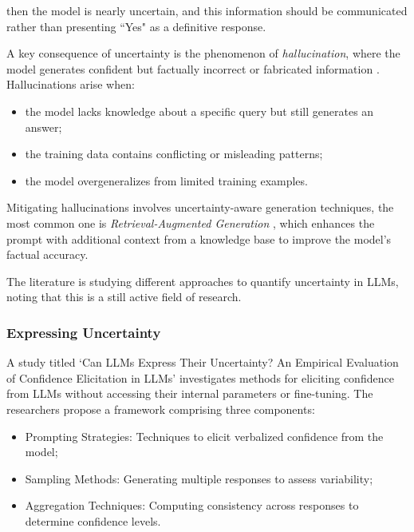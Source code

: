 then the model is nearly uncertain, and this information should be communicated
rather than presenting ``Yes" as a definitive response.

A key consequence of uncertainty is the phenomenon of \emph{hallucination}, where
the model generates confident but factually incorrect or fabricated information \cite{Ji_2023}.
Hallucinations arise when:
\begin{itemize}
  \item the model lacks knowledge about a specific query but still generates an answer;

  \item the training data contains conflicting or misleading patterns;

  \item the model overgeneralizes from limited training examples.
\end{itemize}

Mitigating hallucinations involves uncertainty-aware generation techniques, the most
common one is \emph{Retrieval-Augmented Generation}
\cite{lewis2021retrievalaugmentedgenerationknowledgeintensivenlp}, which enhances
the prompt with additional context from a knowledge base to improve the model's factual
accuracy.

The literature is studying different approaches to quantify uncertainty in LLMs,
noting that this is a still active field of research.

\subsubsection{Expressing Uncertainty}
A study titled `Can LLMs Express Their Uncertainty? An Empirical Evaluation of
Confidence Elicitation in LLMs' \cite{xiong2024llmsexpressuncertaintyempirical} investigates
methods for eliciting confidence from LLMs without accessing their internal parameters
or fine-tuning. The researchers propose a framework comprising three components:
\begin{itemize}
  \item Prompting Strategies: Techniques to elicit verbalized confidence from
    the model;

  \item Sampling Methods: Generating multiple responses to assess variability;

  \item Aggregation Techniques: Computing consistency across responses to
    determine confidence levels.
\end{itemize}

